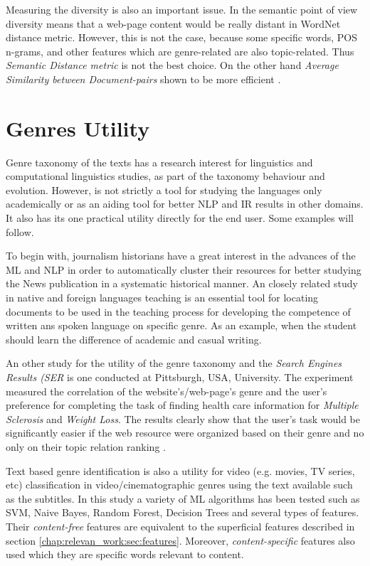 Measuring the diversity is also an important issue. In the semantic point of view diversity means that a web-page content would be really distant in WordNet distance metric. However, this is not the case, because some specific words, POS n-grams, and other features which are genre-related are also topic-related. Thus \textit{Semantic Distance metric } is not the best choice. On the other hand \textit{Average Similarity between Document-pairs} shown to be more efficient \parencite{priyatam2013don_URL}. 
 
    

\section{Genres Utility}\label{chap:relevant_work:sec:intro}

Genre taxonomy of the texts has a research interest for linguistics and computational linguistics studies, as part of the taxonomy behaviour and evolution. However, is not strictly a tool for studying the languages only academically or as an aiding tool for better NLP and IR results in other domains. It also has its one practical utility directly for the end user. Some examples will follow.

To begin with,  journalism historians have a great interest in the advances of the ML and NLP in order to automatically cluster their resources for better studying the News publication in a systematic historical manner. An closely related study in native and foreign languages teaching is an essential tool for locating documents to be used in the teaching process for developing the competence of written ans spoken language on specific genre. As an example, when the student should learn the difference of academic and casual writing.

An other study for the utility of the genre taxonomy and the \textit{Search Engines Results (SER} is one conducted at Pittsburgh, USA, University.  The experiment measured the correlation of the website's/web-page's genre and the user's preference for completing the task of finding health care information for \textit{Multiple Sclerosis} and \textit{Weight Loss}. The results clearly show that the user's task would be significantly easier if the web resource were organized based on their genre and no only on their topic relation ranking \parencite{chi2018sources}.

Text based genre identification is also a utility for video (e.g. movies, TV series, etc) classification in video/cinematographic genres using the text available such as the subtitles. In this study a variety of ML algorithms has been tested such as SVM, Naive Bayes, Random Forest, Decision Trees and several types of features. Their \textit{content-free} features are equivalent to the superficial features described in section \ref{chap:relevan_work:sec:features}. Moreover, \textit{content-specific} features also used which they are specific words relevant to content\parencite{lee2017text}.

